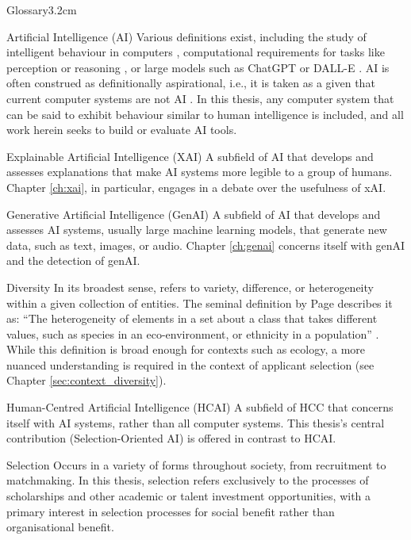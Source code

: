\begin{mclistof}{Glossary}{3.2cm}
    \item[Artificial Intelligence (AI)] Various definitions exist, including the study of intelligent behaviour in computers \cite{wang2008you}, computational requirements for tasks like perception or reasoning \cite{Leake2001ArtiicialI}, or large models such as ChatGPT or DALL-E \cite{du2020ai}. AI is often construed as definitionally aspirational, i.e., it is taken as a given that current computer systems are not AI \cite{wang2008you}. In this thesis, any computer system that can be said to exhibit behaviour similar to human intelligence is included, and all work herein seeks to build or evaluate AI tools.

    \item[Explainable Artificial Intelligence (XAI)] A subfield of AI that develops and assesses explanations that make AI systems more legible to a group of humans. Chapter \ref{ch:xai}, in particular, engages in a debate over the usefulness of xAI.

    \item[Generative Artificial Intelligence (GenAI)] A subfield of AI that develops and assesses AI systems, usually large machine learning models, that generate new data, such as text, images, or audio. Chapter \ref{ch:genai} concerns itself with genAI and the detection of genAI.

    \item[Diversity] In its broadest sense, refers to variety, difference, or heterogeneity within a given collection of entities. The seminal definition by Page describes it as: ``The heterogeneity of elements in a set about a class that takes different values, such as species in an eco-environment, or ethnicity in a population'' \cite{page_diversity_2010}. While this definition is broad enough for contexts such as ecology, a more nuanced understanding is required in the context of applicant selection (see Chapter \ref{sec:context_diversity}).

    \item[Human-Centred Artificial Intelligence (HCAI)] A subfield of HCC that concerns itself with AI systems, rather than all computer systems. This thesis's central contribution (Selection-Oriented AI) is offered in contrast to HCAI.

    \item[Selection] Occurs in a variety of forms throughout society, from recruitment to matchmaking. In this thesis, selection refers exclusively to the processes of scholarships and other academic or talent investment opportunities, with a primary interest in selection processes for social benefit rather than organisational benefit.


\end{mclistof}
